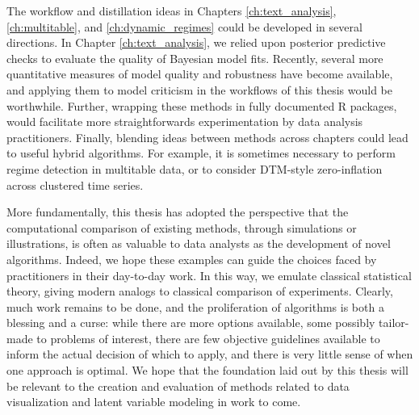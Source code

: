 The workflow and distillation ideas in Chapters \ref{ch:text_analysis},
\ref{ch:multitable}, and \ref{ch:dynamic_regimes} could be developed in several
directions. In Chapter \ref{ch:text_analysis}, we relied upon posterior
predictive checks to evaluate the quality of Bayesian model fits. Recently,
several more quantitative measures of model quality \citep{gorham2015measuring,
  liu2016kernelized} and robustness \citep{giordano2016fast} have become
available, and applying them to model criticism in the workflows of this thesis
would be worthwhile. Further, wrapping these methods in fully documented R
packages, would facilitate more straightforwards experimentation by data
analysis practitioners. Finally, blending ideas between methods across chapters
could lead to useful hybrid algorithms. For example, it is sometimes necessary
to perform regime detection in multitable data, or to consider DTM-style
zero-inflation across clustered time series.

More fundamentally, this thesis has adopted the perspective that the
computational comparison of existing methods, through simulations or
illustrations, is often as valuable to data analysts as the development of novel
algorithms. Indeed, we hope these examples can guide the choices faced by
practitioners in their day-to-day work. In this way, we emulate classical
statistical theory, giving modern analogs to classical comparison of
experiments. Clearly, much work remains to be done, and the proliferation of
algorithms is both a blessing and a curse: while there are more options
available, some possibly tailor-made to problems of interest, there are few
objective guidelines available to inform the actual decision of which to apply,
and there is very little sense of when one approach is optimal. We hope that the
foundation laid out by this thesis will be relevant to the creation and
evaluation of methods related to data visualization and latent variable modeling
in work to come.
